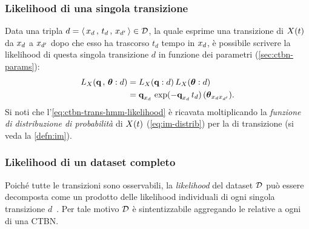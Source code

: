 \subsubsection{Likelihood di una singola transizione}
\label{sec:ctbn-likelihood-single-trans-single-hmp}
Data una tripla $d=\langle \,\mathnormal{x}_{d}\,,\,t_d\,,\,\mathnormal{x}_{d^{\prime}}\,\rangle\in\mathcal{D}$, la quale esprime una transizione di $\mathnormal{X}(t)$ da $\mathnormal{x}_d$ a $\mathnormal{x}_{d^{\prime}}$ dopo che esso ha trascorso $t_d$ tempo in $\mathnormal{x}_d$, è possibile scrivere la likelihood di questa singola transizione $d$ in funzione dei parametri (\ref{sec:ctbn-params}):
\begin{equation}
\label{eq:ctbn-trans-hmm-likelihood}
\begin{split}
L_{\mathnormal{X}}(\boldsymbol{\textbf{\text{q}}}\,,\,\boldsymbol{\textbf{\text{$\theta$}}}:d) &= L_{\mathnormal{X}}(\boldsymbol{\textbf{\text{q}}}:d)\,L_{\mathnormal{X}}(\boldsymbol{\textbf{\text{$\theta$}}}:d) \\
&= \boldsymbol{\textbf{\text{q}}}_{\mathnormal{x}_d}\,\exp(-\boldsymbol{\textbf{\text{q}}}_{\mathnormal{x}_d}\,t_d)\,(\boldsymbol{\textbf{\text{$\theta$}}}_{\mathnormal{x}_{d}\mathnormal{x}_{d^{\prime}}})\text{.}
\end{split}
\end{equation}
Si noti che l'\autoref{eq:ctbn-trans-hmm-likelihood} è ricavata moltiplicando la \emph{funzione di distribuzione di probabilità} di $\mathnormal{X}(t)$ (\autoref{eq:im-distrib}) per la \emph{} di transizione (si veda la \autoref{defn:im}).

\subsubsection{Likelihood di un dataset completo}
\label{sec:ctbn-likelihood-dataset}
Poiché tutte le transizioni sono osservabili, la \emph{likelihood} del dataset $\mathcal{D}$ può essere decomposta come un prodotto delle likelihood individuali di ogni singola transizione $d$~\citep[si veda][3]{Nodelman2002}. Per tale motivo $\mathcal{D}$ è sintentizzabile aggregando le \emph{\stats{}} relative a ogni \mprocess*{} \cond*{} di una \acs{CTBN}.

